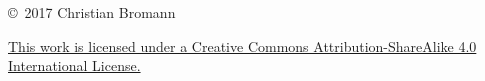\thispagestyle{empty}
\vspace*{\fill}

\noindent \copyright \ 2017 Christian Bromann

\noindent \href{http://creativecommons.org/licenses/by-sa/4.0/}{This work is licensed under a Creative Commons Attribution-ShareAlike 4.0 International License.}

\vspace*{\fill}
